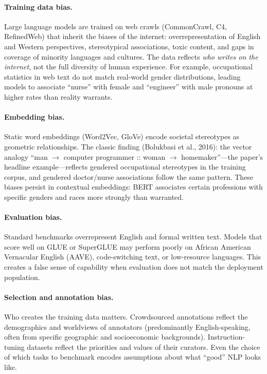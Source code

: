 \paragraph{Training data bias.}
Large language models are trained on web crawls (CommonCrawl, C4, RefinedWeb)
that inherit the biases of the internet: overrepresentation of English and
Western perspectives, stereotypical associations, toxic content, and gaps in
coverage of minority languages and cultures.  The data reflects \emph{who writes
on the internet}, not the full diversity of human experience.  For example,
occupational statistics in web text do not match real-world gender distributions,
leading models to associate ``nurse'' with female and ``engineer'' with male
pronouns at higher rates than reality warrants.

\paragraph{Embedding bias.}
Static word embeddings (Word2Vec, GloVe) encode societal stereotypes as
geometric relationships.  The classic finding (Bolukbasi et al., 2016): the
vector analogy ``man $\to$ computer programmer :: woman $\to$ homemaker''---the
paper's headline example---reflects gendered occupational stereotypes in the
training corpus, and gendered doctor/nurse associations follow the same
pattern.  These biases
persist in contextual embeddings: BERT associates certain professions with
specific genders and races more strongly than warranted.

\paragraph{Evaluation bias.}
Standard benchmarks overrepresent English and formal written text.  Models that
score well on GLUE or SuperGLUE may perform poorly on African American
Vernacular English (AAVE), code-switching text, or low-resource languages.
This creates a false sense of capability when evaluation does not match the
deployment population.

\paragraph{Selection and annotation bias.}
Who creates the training data matters.  Crowdsourced annotations reflect the
demographics and worldviews of annotators (predominantly English-speaking, often
from specific geographic and socioeconomic backgrounds).  Instruction-tuning
datasets reflect the priorities and values of their curators.  Even the choice
of which tasks to benchmark encodes assumptions about what ``good'' NLP looks
like.

